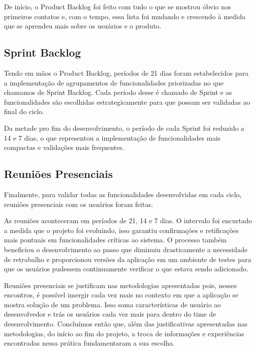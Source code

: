 De início, o Product Backlog foi feito com tudo o que se mostrou óbvio nos primeiros contatos e, com o tempo, essa lista foi mudando e crescendo à medida que se aprendeu mais sobre os usuários e o produto.

\subsection{Sprint Backlog}

Tendo em mãos o Product Backlog, períodos de 21 dias foram estabelecidos para a implementação de agrupamentos de funcionalidades priorizadas no que chamamos de Sprint Backlog. Cada período desse é chamado de Sprint e as funcionalidades são escolhidas estrategicamente para que possam ser validadas ao final do ciclo.

Da metade pro fim do desenvolvimento, o período de cada Sprint foi reduzido a 14 e 7 dias, o que representou a implementação de funcionalidades mais compactas e validações mais frequentes.

\subsection{Reuniões Presenciais}

Finalmente, para validar todas as funcionalidades desenvolvidas em cada ciclo, reuniões presenciais com os usuários foram feitas. 

As reuniões aconteceram em períodos de 21, 14 e 7 dias. O intervalo foi encurtado a medida que o projeto foi evoluindo, isso garantiu confirmações e retificações mais pontuais em funcionalidades críticas ao sistema. O processo também beneficiou o desenvolvimento ao passo que diminuiu drasticamente a necessidade de retrabalho e proporcionou versões da aplicação em um ambiente de testes para que os usuários pudessem continuamente verificar o que estava sendo adicionado.

Reuniões presenciais se justificam nas metodologias apresentadas pois, nesses encontros, é possível imergir cada vez mais no contexto em que a aplicação se mostra solução de um problema. Isso soma características de usuário ao desenvolvedor e trás os usuários cada vez mais para dentro do time de desenvolvimento. Concluímos então que, além das justificativas apresentadas nas metodologias, do início ao fim do projeto, a troca de informações e experiências encontradas nessa prática fundamentaram a sua escolha.


